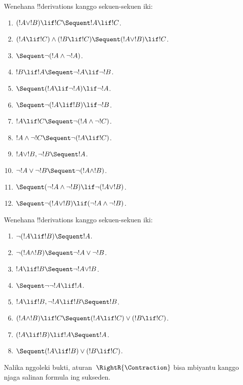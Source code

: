 \documentclass[../../../include/open-logic-section]{subfiles}
\begin{document}
\begin{prob}
Wenehana !!{derivation}s kanggo sekuen-sekuen iki:
\begin{enumerate}
\item $(!A \lor !B) \lif !C \Sequent !A \lif !C$.
\item $(!A \lif !C) \land (!B \lif !C) \Sequent (!A \lor !B) \lif !C$.
\item $\Sequent \lnot(!A \land \lnot !A)$.
\item $!B \lif !A \Sequent \lnot !A \lif \lnot !B$.
\item $\Sequent (!A \lif \lnot !A) \lif \lnot !A$.
\item $\Sequent \lnot(!A \lif !B) \lif \lnot !B$.
\item $!A \lif !C \Sequent \lnot (!A \land \lnot !C)$.
\item $!A \land \lnot !C \Sequent \lnot (!A \lif !C)$.
\item $!A \lor !B, \lnot !B \Sequent !A$.
\item $\lnot !A \lor \lnot !B \Sequent \lnot(!A \land !B)$.
\item $\Sequent (\lnot !A \land \lnot !B) \lif\lnot(!A \lor !B)$.
\item $\Sequent \lnot(!A \lor !B) \lif (\lnot !A \land \lnot !B)$.
\end{enumerate}
\end{prob}

\begin{prob}
Wenehana !!{derivation}s kanggo sekuen-sekuen iki:
\begin{enumerate}
\item $\lnot(!A \lif !B) \Sequent !A$.
\item $\lnot(!A \land !B) \Sequent \lnot !A \lor \lnot !B$.
\item $!A \lif !B \Sequent \lnot !A \lor !B$.
\item $\Sequent \lnot \lnot !A \lif !A$.
\item $!A \lif !B, \lnot !A \lif !B \Sequent !B$.
\item $(!A \land !B) \lif !C \Sequent (!A \lif !C) \lor (!B \lif !C)$.
\item $(!A \lif !B) \lif !A \Sequent !A$.
\item $\Sequent (!A \lif !B) \lor (!B \lif !C)$.
\end{enumerate}
Nalika nggoleki bukti, aturan~$\RightR{\Contraction}$ bisa mbiyantu kanggo
njaga salinan formula ing sukseden.
\end{prob}
\end{document}
